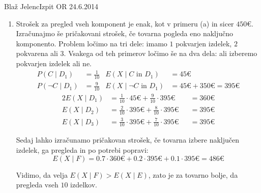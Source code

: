 \begin{naloga}{Blaž Jelenc}{Izpit OR 24.6.2014}
\begin{odgovor}
\begin{enumerate}
    \item Strošek za pregled vseh komponent je enak, kot v primeru (a) in sicer $450 €$. \\
    Izračunajmo še pričakovani strošek, če tovarna pogleda eno naključno komponento. Problem ločimo na tri dele: imamo $1$ pokvarjen izdelek, $2$ pokvarena ali $3$. Vsakega od teh primerov ločimo še na dva dela: ali izberemo pokvarjen izdelek ali ne.
    \begin{align*}
    P(C \mid D_1)  &= \frac{1}{10} &E(X\mid C \text{ in } D_1) &= 45 €\\
    P(\neg C \mid D_1) &= \frac{9}{10} &E(X\mid \neg C \text{ in } D_1) &= 45 € + 350 € = 395 €
    \end{align*}
    \begin{alignat*}{2}
    E(X\mid D_1)&= \frac{1}{10} \cdot 45 € + \frac{9}{10} \cdot 395 € &&=  360 €\\
    E(X \mid D_2) &= \frac{2}{10} \cdot 395 € + \frac{8}{10} \cdot 395 € &&= 395 €\\
    E(X\mid D_3) &= \frac{3}{10} \cdot 395 € + \frac{7}{10} \cdot 395 € &&= 395 €
    \end{alignat*}
    
    
    Sedaj lahko izračunamo pričakovan strošek, če tovarna izbere naključen izdelek, ga pregleda in po potrebi popravi:
    $$
    E(X \mid F) = 0.7 \cdot 360 € + 0.2 \cdot 395 € + 0.1 \cdot 395 € = 486 €
    $$
    
    Vidimo, da velja $E(X\mid F) >  E(X\mid E)$, zato je za tovarno bolje, da pregleda vseh $10$ izdelkov.
    \end{enumerate}
\end{odgovor}
\end{naloga}
